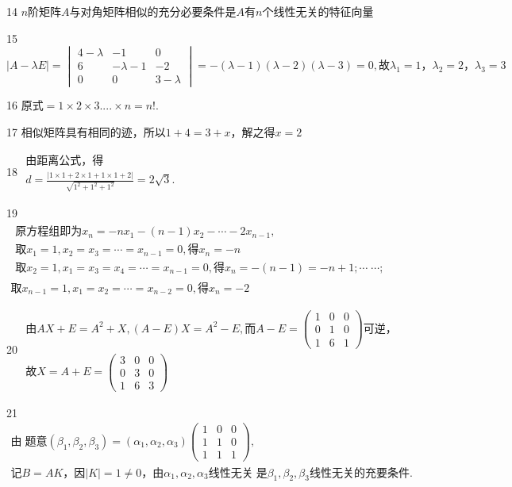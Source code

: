 14
$n\mathrm{阶矩阵}A\mathrm{与对角矩阵相似的充分必要条件是}A有n\mathrm{个线性无关的特征向量}$


15
$\left|A-\lambda E\right|=\begin{vmatrix}4-\lambda&-1&0\\6&-\lambda-1&-2\\0&0&3-\lambda\end{vmatrix}=-(\lambda-1)(\lambda-2)(\lambda-3)=0,故\lambda_1=1，\lambda_2=2，\lambda_3=3$


16
$\mathrm{原式}=1\times2\times3....\times n=n!.$


17
$\mathrm{相似矩阵具有相同的迹}，\mathrm{所以}1+4=3+x，\mathrm{解之得}x=2$


18
$\begin{array}{l}\mathrm{由距离公式}，得\\d=\frac{\left|1\times1+2\times1+1\times1+2\right|}{\sqrt{1^2+1^2+1^2}}=2\sqrt3.\end{array}$


19
$\begin{array}{l}\begin{array}{l}\mathrm{原方程组即为}x_n=-nx_1-(n-1)x_2-\cdots-2x_{n-1},\\取x_1=1,x_2=x_3=\cdots=x_{n-1}=0,得x_n=-n\\取x_2=1,x_1=x_3=x_4=\cdots=x_{n-1}=0,得x_n=-(n-1)=-n+1;\cdots\;\cdots;\end{array}\\取x_{n-1}=1,x_1=x_2=\cdots=x_{n-2}=0,得x_n=-2\end{array}$


20
$\begin{array}{l}由AX+E=A^2+X,\left(A-E\right)X=A^2-E,而A-E=\begin{pmatrix}1&0&0\\0&1&0\\1&6&1\end{pmatrix}\mathrm{可逆}，\\故X=A+E=\begin{pmatrix}3&0&0\\0&3&0\\1&6&3\end{pmatrix}\end{array}$


21
$\begin{array}{l}由\;\mathrm{题意}(\beta_1,\beta_2,\beta_3)=(\alpha_1,\alpha_2,\alpha_3)\begin{pmatrix}1&0&0\\1&1&0\\1&1&1\end{pmatrix},\\记B=AK，因\vert K\vert=1\neq0，由\alpha_1,\alpha_2,\alpha_3\mathrm{线性无关}\;是\beta_1,\beta_2,\beta_3\mathrm{线性无关的充要条件}.\end{array}$


